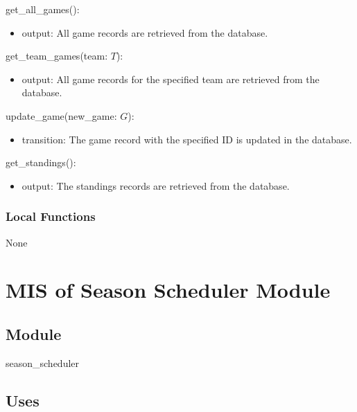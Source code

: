 \documentclass[12pt, titlepage]{article}
\begin{document}
\noindent get\_all\_games():
\begin{itemize}
\item output: All game records are retrieved from the database.
\end{itemize}

\noindent get\_team\_games(team: $T$):
\begin{itemize}
\item output: All game records for the specified team are retrieved from the database.
\end{itemize}

\noindent update\_game(new\_game: $G$):
\begin{itemize}
\item transition: The game record with the specified ID is updated in the database.
\end{itemize}

\noindent get\_standings():
\begin{itemize}
\item output: The standings records are retrieved from the database.
\end{itemize}

\subsubsection{Local Functions}


None

\newpage

\section{MIS of Season Scheduler Module} \label{mS}



\subsection{Module}

season\_scheduler

\subsection{Uses}
\end{document}
